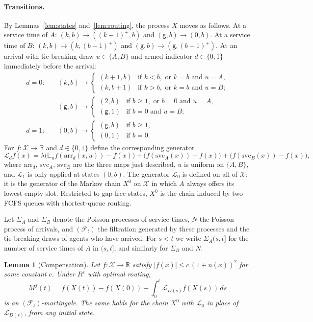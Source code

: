 \documentclass[11pt]{article}
\newtheorem{blem}[bthm]{Lemma}
\theoremstyle{definition}
\theoremstyle{remark}
\newcommand{\E}{\mathbb{E}}
\newcommand{\cX}{\mathcal{X}}
\newcommand{\cF}{\mathcal{F}}
\newcommand{\cL}{\mathcal{L}}
\newcommand{\Reps}{R^{\varepsilon}}
\newcommand{\gp}{\mathsf{g}}
\newcommand{\SvA}{\Sigma_A}
\newcommand{\SvB}{\Sigma_B}
\begin{document}
\paragraph{Transitions.}
By Lemmas~\ref{lem:states} and~\ref{lem:routing}, the process $X$ moves as
follows. At a service time of $A$: $(k,b)\to((k-1)^+,b)$ and $(\gp,b)\to(0,b)$.
At a service time of $B$: $(k,b)\to(k,(b-1)^+)$ and $(\gp,b)\to(\gp,(b-1)^+)$.
At an arrival with tie-breaking draw $u\in\{A,B\}$ and armed indicator
$d\in\{0,1\}$ immediately before the arrival:
\begin{align*}
d=0:\quad & (k,b)\to
  \begin{cases}(k+1,b)&\text{if }k<b,\text{ or }k=b\text{ and }u=A,\\
               (k,b+1)&\text{if }k>b,\text{ or }k=b\text{ and }u=B;\end{cases}\\
& (\gp,b)\to
  \begin{cases}(2,b)&\text{if }b\ge1,\text{ or }b=0\text{ and }u=A,\\
               (\gp,1)&\text{if }b=0\text{ and }u=B;\end{cases}\\
d=1:\quad & (0,b)\to
  \begin{cases}(\gp,b)&\text{if }b\ge1,\\ (0,1)&\text{if }b=0.\end{cases}
\end{align*}
For $f:\cX\to\mathbb{R}$ and $d\in\{0,1\}$ define the corresponding generator
\[
  \cL_d f(x)=\lambda\bigl(\E_u f(\mathrm{arr}_d(x,u))-f(x)\bigr)
  +\bigl(f(\mathrm{svc}_A(x))-f(x)\bigr)+\bigl(f(\mathrm{svc}_B(x))-f(x)\bigr),
\]
where $\mathrm{arr}_d$, $\mathrm{svc}_A$, $\mathrm{svc}_B$ are the three maps
just described, $u$ is uniform on $\{A,B\}$, and $\cL_1$ is only applied at
states $(0,b)$. The generator $\cL_0$ is defined on all of $\cX$; it is the
generator of the Markov chain $X^0$ on $\cX$ in which $A$ always offers its
lowest empty slot. Restricted to gap-free states, $X^0$ is the chain induced by
two FCFS queues with shortest-queue routing.

Let $\SvA$ and $\SvB$ denote the Poisson processes of service times, $N$ the
Poisson process of arrivals, and $(\cF_t)$ the filtration generated by these
processes and the tie-breaking draws of agents who have arrived. For $s<t$ we
write $\SvA(s,t]$ for the number of service times of $A$ in $(s,t]$, and
similarly for $\SvB$ and $N$.

\begin{blem}[Compensation]\label{lem:dynkin}
Let $f:\cX\to\mathbb{R}$ satisfy $|f(x)|\le c\,(1+n(x))^{2}$ for some constant
$c$. Under $\Reps$ with optimal routing,
\[
  M^f(t)=f(X(t))-f(X(0))-\int_0^t \cL_{D(s)}f(X(s))\,ds
\]
is an $(\cF_t)$-martingale. The same holds for the chain $X^0$ with $\cL_0$ in
place of $\cL_{D(s)}$, from any initial state.
\end{blem}
\end{document}
